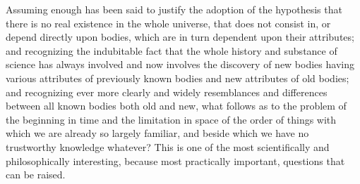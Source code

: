 \documentclass[a4paper, 11pt, oneside, polutonikogreek, english]{article}
\begin{document}
Assuming enough has been said to justify the adoption of the hypothesis that there is no real existence in the whole universe, that does not consist in, or depend directly upon bodies, which are in turn dependent upon their attributes; and recognizing the indubitable fact that the whole history and substance of science has always involved and now involves the discovery of new bodies having various attributes of previously known bodies and new attributes of old bodies; and recognizing ever more clearly and widely resemblances and differences between all known bodies both old and new, what follows as to the problem of the beginning in time and the limitation in space of the order of things with which we are already so largely familiar, and beside which we have no trustworthy knowledge whatever? This is one of the most scientifically and philosophically interesting, because most practically important, questions that can be raised.
\end{document}
